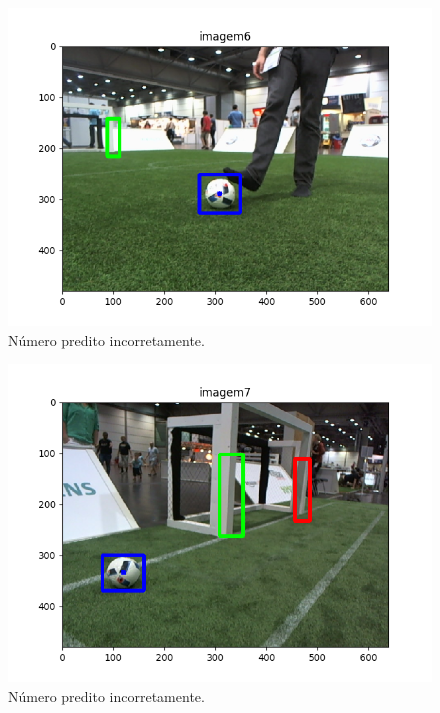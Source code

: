 \documentclass[conference]{IEEEtran}
\begin{document}
\begin{figure}[htbp]
\centering
\centerline{\includegraphics[scale=0.5]{imagens/imagem6_detection.png}}
\caption{Número predito incorretamente.}
\label{imagem6_detection}
\end{figure}

\begin{figure}[htbp]
\centering
\centerline{\includegraphics[scale=0.5]{imagens/imagem7_detection.png}}
\caption{Número predito incorretamente.}
\label{imagem7_detection}
\end{figure}
\end{document}
